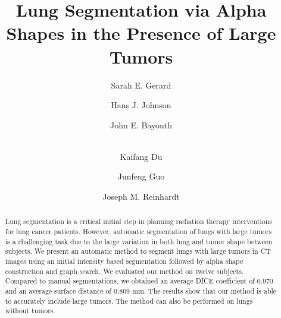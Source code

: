 \documentclass{llncs}
\begin{document}
%
\frontmatter          %
%
\pagestyle{headings}  %
%

%
%

\mainmatter              %
%
\title{Lung Segmentation via Alpha Shapes in the Presence of Large Tumors}
%
%
\author{
Sarah E. Gerard \and
Hans J. Johnson \and
John E. Bayouth \and\\
Kaifang Du \and
Junfeng Guo \and
Joseph M. Reinhardt
}
%
%
%


\maketitle              %

\begin{abstract}
Lung segmentation is a critical initial step in planning radiation therapy interventions for lung cancer patients. However, automatic segmentation of lungs with large tumors is a challenging task due to the large variation in both lung and tumor shape between subjects. We present an automatic method to segment lungs with large tumors in CT images using an initial intensity based segmentation followed by alpha shape construction and graph search. We evaluated our method on twelve subjects. Compared to manual segmentations, we obtained an average DICE coefficient of 0.970 and an average surface distance of 0.809 mm. The results show that our method is able to accurately include large tumors. The method can also be performed on lungs without tumors. 

\end{abstract}
%
\end{document}
